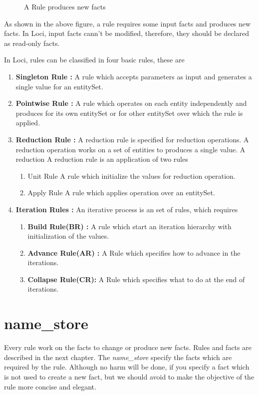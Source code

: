 \begin{figure}[h]
\vspace{2.50in}\caption { A Rule produces new facts }
\label {FigLocalReduction}
\end{figure}

As shown in the above figure, a rule requires some input facts and 
produces new facts. In Loci, input facts cann't be modified, therefore,
they should be declared as read-only facts.

\par In Loci, rules can be classified in four basic rules, these are
\begin{enumerate}
\item {\bf Singleton Rule :} A rule which accepts parameters as input and 
generates a single value for an entitySet.
%
\item {\bf Pointwise Rule :}  A rule which operates on each entity independently and
produces for its own entitySet or for other entitySet over which the rule is applied.
%
\item {\bf Reduction Rule :}  A reduction rule is specified for reduction operations. 
A reduction operation works on a set of entities to produces a single value. A reduction
A reduction rule is an application of two rules
\begin{enumerate}
\item Unit Rule  A rule which initialize the values for reduction operation. 
\item Apply Rule A rule which applies operation over an entitySet.
\end{enumerate}
%
\item {\bf Iteration Rules :}  An iterative process is an set of rules, which requires
%
\begin{enumerate}
\item {\bf Build Rule(BR) :} A rule  which start an iteration hierarchy with initialization
of the values.
\item {\bf Advance Rule(AR) :} A Rule which specifies how to advance in the iterations.
\item {\bf Collapse Rule(CR):} A Rule which specifies what to do at the end of iterations.
\end{enumerate}
\end{enumerate}
%

\section {name\_store}
Every rule work on the facts to change or produce new facts. Rules and
facts are described in the next chapter. The {\em name\_store} specify the 
facts which are required by the rule. Although
no harm will be done, if you specify a fact which is not used to create
a new fact, but we should avoid to make the objective of the rule more
concise and elegant.


